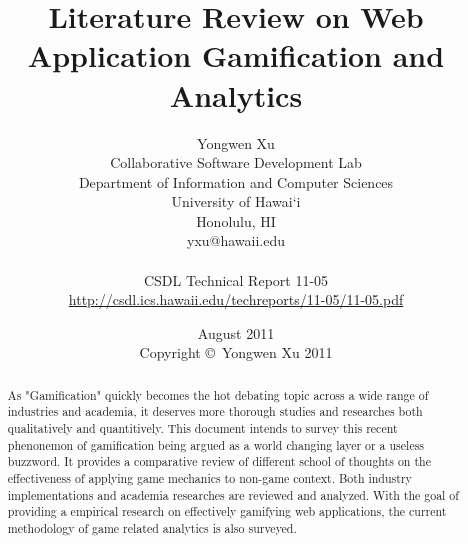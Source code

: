 \documentclass[11pt]{report}
\begin{document}
\title{Literature Review on Web Application Gamification and Analytics}
\author{Yongwen Xu \\
Collaborative Software Development Lab \\
Department of Information and Computer Sciences \\
University of Hawai`i \\
Honolulu, HI \\
yxu@hawaii.edu \\
\\
CSDL Technical Report 11-05 \\
\url{http://csdl.ics.hawaii.edu/techreports/11-05/11-05.pdf}
}
\date{August 2011\\[3pt]
Copyright \copyright\ Yongwen Xu 2011}

\maketitle

\tableofcontents

\begin{abstract}
As "Gamification" quickly becomes the hot debating topic across a wide range of industries and academia, it deserves more thorough studies and researches both qualitatively and quantitively. This document intends to survey this recent phenonemon of gamification being argued as a world changing layer or a useless buzzword. It provides a comparative review of different school of thoughts on the effectiveness of applying game mechanics to non-game context. Both industry implementations and academia researches are reviewed and analyzed. With the goal of providing a empirical research on effectively gamifying web applications, the current methodology of game related analytics is also surveyed.
\end{abstract}












%
%
%


\end{document}
